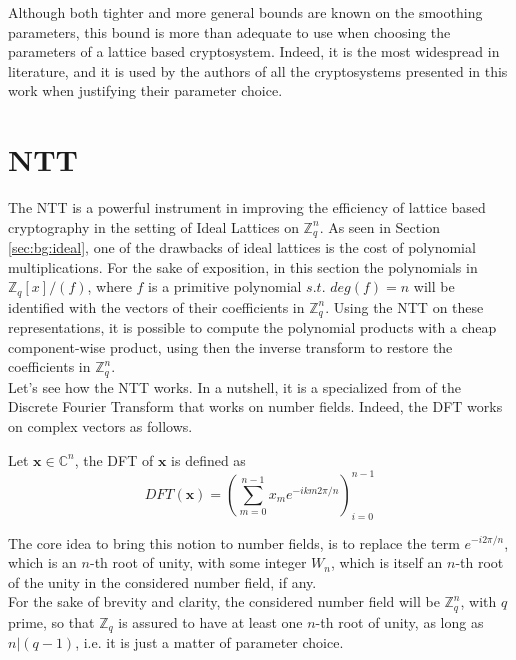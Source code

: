 Although both tighter and more general bounds are known on the smoothing parameters, this bound is more than adequate to use when choosing the parameters of a lattice based cryptosystem. Indeed, it is the most widespread in literature, and it is used by the authors of all the cryptosystems presented in this work when justifying their parameter choice.

\section{NTT}\label{sec:bg:ntt}

The NTT is a powerful instrument in improving the efficiency of lattice based cryptography in the setting of Ideal Lattices on $\mathbb{Z}_q^n$. As seen in Section \ref{sec:bg:ideal}, one of the drawbacks of ideal lattices is the cost of polynomial multiplications. For the sake of exposition, in this section the polynomials in $\mathbb{Z}_q[x]/(f)$, where $f$ is a primitive polynomial $s.t.$ $deg(f)=n$ will be identified with the vectors of their coefficients in $\mathbb{Z}_q^n$. Using the NTT on these representations, it is possible to compute the polynomial products with a cheap component-wise product, using then the inverse transform to restore the coefficients in $\mathbb{Z}_q^n$.\\

Let's see how the NTT works. In a nutshell, it is a specialized from of the Discrete Fourier Transform that works on number fields. Indeed, the DFT works on complex vectors as follows.

\begin{definition}
Let $\mathbf{x}\in\mathbb{C}^n$, the DFT of $\mathbf{x}$ is defined as
\begin{equation*}
DFT(\mathbf{x})=\left(\sum_{m=0}^{n-1}x_me^{-ikm2\pi/n} \right)_{i=0}^{n-1}
\end{equation*}
\end{definition}

The core idea to bring this notion to number fields, is to replace the term $e^{-i2\pi/n}$, which is an $n$-th root of unity, with some integer $W_n$, which is itself an $n$-th root of the unity in the considered number field, if any.\\
For the sake of brevity and clarity, the considered number field will be $\mathbb{Z}_q^n$, with $q$ prime, so that $\mathbb{Z}_q$ is assured to have at least one $n$-th root of unity, as long as $n|(q-1)$, i.e. it is just a matter of parameter choice.

